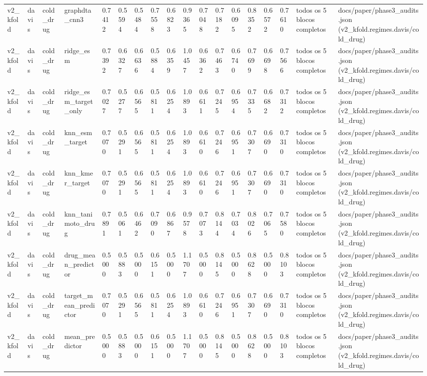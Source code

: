 \begin{table}[htbp]
\begin{tabular}{llllllllllllllllll}
v2\_kfold & davis & cold\_drug & graphdta\_cnn3 & 0.7412 & 0.5594 & 0.5484 & 0.7558 & 0.6823 & 0.9365 & 0.7048 & 0.7182 & 0.6095 & 0.8352 & 0.6572 & 0.7610 & todos os 5 blocos completos & docs/paper/phase3\_audits.json (v2\_kfold.regimes.davis/cold\_drug) \\
v2\_kfold & davis & cold\_drug & ridge\_esm & 0.7392 & 0.6327 & 0.6636 & 0.5884 & 0.6359 & 1.0457 & 0.6362 & 0.7463 & 0.6740 & 0.7699 & 0.6698 & 0.7566 & todos os 5 blocos completos & docs/paper/phase3\_audits.json (v2\_kfold.regimes.davis/cold\_drug) \\
v2\_kfold & davis & cold\_drug & ridge\_esm\_target\_only & 0.7027 & 0.5277 & 0.6565 & 0.5811 & 0.6254 & 1.0893 & 0.6611 & 0.7245 & 0.6954 & 0.7335 & 0.6682 & 0.7312 & todos os 5 blocos completos & docs/paper/phase3\_audits.json (v2\_kfold.regimes.davis/cold\_drug) \\
v2\_kfold & davis & cold\_drug & knn\_esm\_target & 0.7070 & 0.5291 & 0.6565 & 0.5811 & 0.6254 & 1.0893 & 0.6610 & 0.7246 & 0.6951 & 0.7307 & 0.6690 & 0.7310 & todos os 5 blocos completos & docs/paper/phase3\_audits.json (v2\_kfold.regimes.davis/cold\_drug) \\
v2\_kfold & davis & cold\_drug & knn\_kmer\_target & 0.7070 & 0.5291 & 0.6565 & 0.5811 & 0.6254 & 1.0893 & 0.6610 & 0.7246 & 0.6951 & 0.7307 & 0.6690 & 0.7310 & todos os 5 blocos completos & docs/paper/phase3\_audits.json (v2\_kfold.regimes.davis/cold\_drug) \\
v2\_kfold & davis & cold\_drug & knn\_tanimoto\_drug & 0.7891 & 0.5061 & 0.6462 & 0.7090 & 0.6867 & 0.9578 & 0.7073 & 0.8144 & 0.7034 & 0.8026 & 0.7065 & 0.7580 & todos os 5 blocos completos & docs/paper/phase3\_audits.json (v2\_kfold.regimes.davis/cold\_drug) \\
v2\_kfold & davis & cold\_drug & drug\_mean\_predictor & 0.5000 & 0.5883 & 0.5000 & 0.6151 & 0.5000 & 1.1707 & 0.5000 & 0.8145 & 0.5000 & 0.8628 & 0.5000 & 0.8103 & todos os 5 blocos completos & docs/paper/phase3\_audits.json (v2\_kfold.regimes.davis/cold\_drug) \\
v2\_kfold & davis & cold\_drug & target\_mean\_predictor & 0.7070 & 0.5291 & 0.6565 & 0.5811 & 0.6254 & 1.0893 & 0.6610 & 0.7246 & 0.6951 & 0.7307 & 0.6690 & 0.7310 & todos os 5 blocos completos & docs/paper/phase3\_audits.json (v2\_kfold.regimes.davis/cold\_drug) \\
v2\_kfold & davis & cold\_drug & mean\_predictor & 0.5000 & 0.5883 & 0.5000 & 0.6151 & 0.5000 & 1.1707 & 0.5000 & 0.8145 & 0.5000 & 0.8628 & 0.5000 & 0.8103 & todos os 5 blocos completos & docs/paper/phase3\_audits.json (v2\_kfold.regimes.davis/cold\_drug) \\

\end{tabular}
\end{table}

